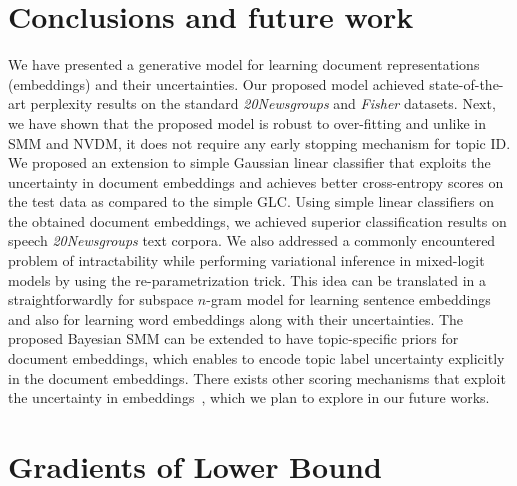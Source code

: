 \documentclass[journal]{IEEEtran}
\begin{document}
\section{Conclusions and future work}
\label{sec:concl}
We have presented a generative model for learning document representations 
(embeddings) and their uncertainties. Our proposed model achieved 
state-of-the-art perplexity results on the standard \textit{20Newsgroups} and 
\textit{Fisher} datasets. Next, we have shown that the proposed model is robust 
to over-fitting and unlike in SMM and NVDM, it does not require any early 
stopping mechanism for topic ID. We proposed an extension to simple Gaussian 
linear classifier that exploits the uncertainty in document embeddings and 
achieves better cross-entropy scores on the test data as compared to the simple 
GLC. Using simple linear classifiers on the 
obtained document embeddings, we achieved superior classification results on 
 speech \textit{20Newsgroups} text corpora. We also addressed a 
commonly encountered problem of intractability while performing variational 
inference in mixed-logit models by using the re-parametrization trick. This 
idea can be translated in a straightforwardly for subspace \(n\)-gram model for 
learning sentence embeddings and also for learning word embeddings along with 
their uncertainties. The proposed Bayesian SMM can be extended to have 
topic-specific priors for document embeddings, which enables to encode topic 
label uncertainty 
explicitly in the document embeddings. There exists other scoring mechanisms 
that exploit the uncertainty in embeddings~\cite{Brummer:2018:GE}, which we 
plan to explore in our future works.






\appendices


\section{Gradients of Lower Bound}
\end{document}
